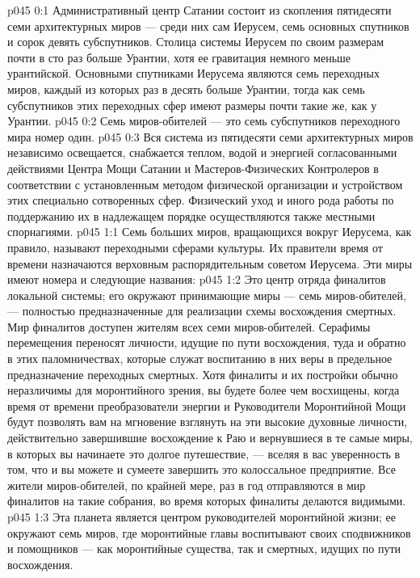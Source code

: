 \author{Мелхиседек}
\vs p045 0:1 Административный центр Сатании состоит из скопления пятидесяти семи архитектурных миров --- среди них сам Иерусем, семь основных спутников и сорок девять субспутников. Столица системы Иерусем по своим размерам почти в сто раз больше Урантии, хотя ее гравитация немного меньше урантийской. Основными спутниками Иерусема являются семь переходных миров, каждый из которых раз в десять больше Урантии, тогда как семь субспутников этих переходных сфер имеют размеры почти такие же, как у Урантии.
\vs p045 0:2 Семь миров\hyp{}обителей --- это семь субспутников переходного мира номер один.
\vs p045 0:3 Вся система из пятидесяти семи архитектурных миров независимо освещается, снабжается теплом, водой и энергией согласованными действиями Центра Мощи Сатании и Мастеров\hyp{}Физических Контролеров в соответствии с установленным методом физической организации и устройством этих специально сотворенных сфер. Физический уход и иного рода работы по поддержанию их в надлежащем порядке осуществляются также местными спорнагиями.
\vs p045 1:1 Семь больших миров, вращающихся вокруг Иерусема, как правило, называют переходными сферами культуры. Их правители время от времени назначаются верховным распорядительным советом Иерусема. Эти миры имеют номера и следующие названия:
\vs p045 1:2 \pc {} Это центр отряда финалитов локальной системы; его окружают принимающие миры --- семь миров\hyp{}обителей, --- полностью предназначенные для реализации схемы восхождения смертных. Мир финалитов доступен жителям всех семи миров\hyp{}обителей. Серафимы перемещения переносят личности, идущие по пути восхождения, туда и обратно в этих паломничествах, которые служат воспитанию в них веры в предельное предназначение переходных смертных. Хотя финалиты и их постройки обычно неразличимы для моронтийного зрения, вы будете более чем восхищены, когда время от времени преобразователи энергии и Руководители Моронтийной Мощи будут позволять вам на мгновение взглянуть на эти высокие духовные личности, действительно завершившие восхождение к Раю и вернувшиеся в те самые миры, в которых вы начинаете это долгое путешествие, --- вселяя в вас уверенность в том, что и вы можете и сумеете завершить это колоссальное предприятие. Все жители миров\hyp{}обителей, по крайней мере, раз в год отправляются в мир финалитов на такие собрания, во время которых финалиты делаются видимыми.
\vs p045 1:3 \pc {} Эта планета является центром руководителей моронтийной жизни; ее окружают семь миров, где моронтийные главы воспитывают своих сподвижников и помощников --- как моронтийные существа, так и смертных, идущих по пути восхождения.
